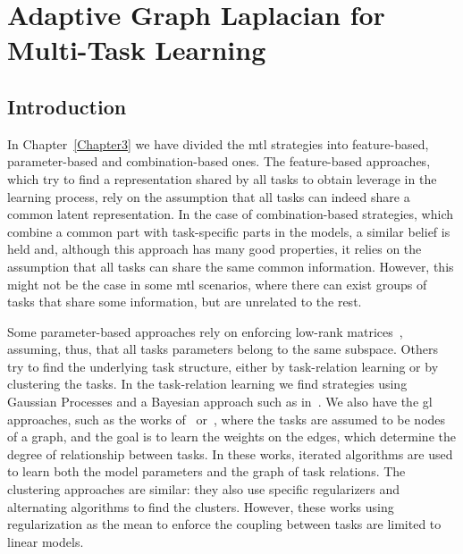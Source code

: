 
\chapter{Adaptive Graph Laplacian for Multi-Task Learning} %
\label{Chapter5}

{\bf \small{

    }}

\section{Introduction}
In Chapter~\ref{Chapter3} we have divided the \acrfull{mtl} strategies into feature-based, parameter-based and combination-based ones.
The feature-based approaches, which try to find a representation shared by all tasks to obtain leverage in the learning process, rely on the assumption that all tasks can indeed share a common latent representation.
In the case of combination-based strategies, which combine a common part with task-specific parts in the models, a similar belief is held and, although this approach has many good properties, it relies on the assumption that all tasks can share the same common information.
However, this might not be the case in some \acrshort{mtl} scenarios, where there can exist groups of tasks that share some information, but are unrelated to the rest.

%
%
Some parameter-based approaches rely on enforcing low-rank matrices~\citep{AndoZ05,ChenTLY09,PongTJY10}, assuming, thus, that all tasks parameters belong to the same subspace.
Others try to find the underlying task structure, either by task-relation learning or by clustering the tasks. In the task-relation learning we find strategies using Gaussian Processes and a Bayesian approach such as in~\citet{BonillaCW07,ZhangY10}. We also have the \acrfull{gl} approaches, such as the works of~\citet{EvgeniouMP05} or~\citet{argyriou2013learning}, where the tasks are assumed to be nodes of a graph, and the goal is to learn the weights on the edges, which determine the degree of relationship between tasks.
In these works, iterated algorithms are used to learn both the model parameters and the graph of task relations.
The clustering approaches are similar: they also use specific regularizers and alternating algorithms to find the clusters.
However, these works using regularization as the mean to enforce the coupling between tasks are limited to linear models.

